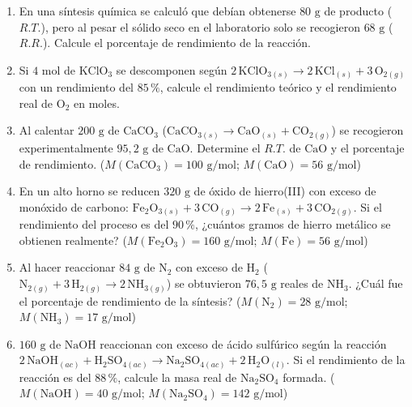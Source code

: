 \documentclass[12pt, letterpaper]{article}
\newcommand{\pc}{\text{\%}}
\begin{document}
\begin{enumerate}[leftmargin=*, start=37]

  \item \medio{}\hspace{0.55em}En una síntesis química se calculó que debían obtenerse $80\text{ g}$ de producto ($R.T.$), pero al pesar el sólido seco en el laboratorio solo se recogieron $68\text{ g}$ ($R.R.$). Calcule el porcentaje de rendimiento de la reacción.

  \item \medio{}\hspace{0.55em}Si $4\text{ mol}$ de $\text{KClO}_3$ se descomponen según $2\,\text{KClO}_{3(s)} \longrightarrow 2\,\text{KCl}_{(s)} + 3\,\text{O}_{2(g)}$ con un rendimiento del $85\,\pc$, calcule el rendimiento teórico y el rendimiento real de $\text{O}_2$ en moles.

  \item \medio{}\hspace{0.55em}Al calentar $200\text{ g}$ de $\text{CaCO}_3$ ($\text{CaCO}_{3(s)} \longrightarrow \text{CaO}_{(s)} + \text{CO}_{2(g)}$) se recogieron experimentalmente $95{,}2\text{ g}$ de $\text{CaO}$. Determine el $R.T.$ de $\text{CaO}$ y el porcentaje de rendimiento. ($M(\text{CaCO}_3) = 100\text{ g/mol}$; $M(\text{CaO}) = 56\text{ g/mol}$)

  \item \dificil{}\hspace{0.55em}En un alto horno se reducen $320\text{ g}$ de óxido de hierro(III) con exceso de monóxido de carbono: $\text{Fe}_2\text{O}_{3(s)} + 3\,\text{CO}_{(g)} \longrightarrow 2\,\text{Fe}_{(s)} + 3\,\text{CO}_{2(g)}$. Si el rendimiento del proceso es del $90\,\pc$, ¿cuántos gramos de hierro metálico se obtienen realmente? ($M(\text{Fe}_2\text{O}_3) = 160\text{ g/mol}$; $M(\text{Fe}) = 56\text{ g/mol}$)

  \item \dificil{}\hspace{0.55em}Al hacer reaccionar $84\text{ g}$ de $\text{N}_2$ con exceso de $\text{H}_2$ ($\text{N}_{2(g)} + 3\,\text{H}_{2(g)} \longrightarrow 2\,\text{NH}_{3(g)}$) se obtuvieron $76{,}5\text{ g}$ reales de $\text{NH}_3$. ¿Cuál fue el porcentaje de rendimiento de la síntesis? ($M(\text{N}_2) = 28\text{ g/mol}$; $M(\text{NH}_3) = 17\text{ g/mol}$)

  \item \dificil{}\hspace{0.55em}$160\text{ g}$ de $\text{NaOH}$ reaccionan con exceso de ácido sulfúrico según la reacción $2\,\text{NaOH}_{(ac)} + \text{H}_2\text{SO}_{4(ac)} \longrightarrow \text{Na}_2\text{SO}_{4(ac)} + 2\,\text{H}_2\text{O}_{(l)}$. Si el rendimiento de la reacción es del $88\,\pc$, calcule la masa real de $\text{Na}_2\text{SO}_4$ formada. ($M(\text{NaOH}) = 40\text{ g/mol}$; $M(\text{Na}_2\text{SO}_4) = 142\text{ g/mol}$)


\end{enumerate}
\end{document}

